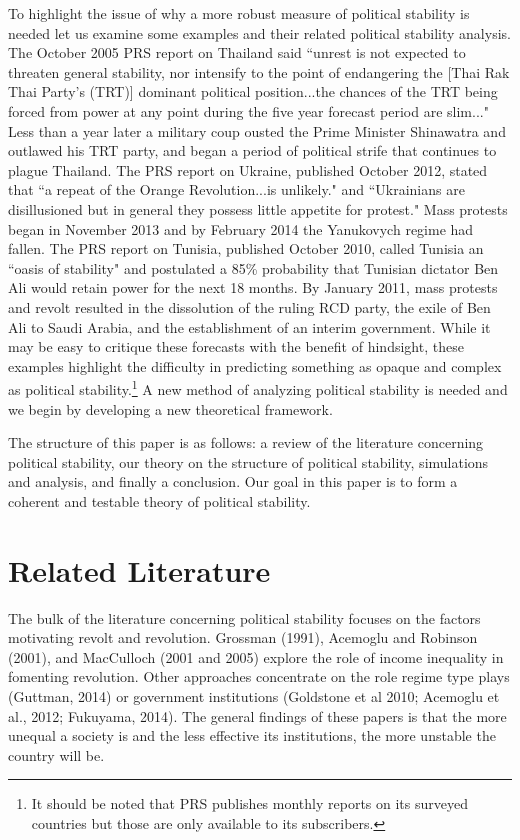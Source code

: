 \documentclass[12pt]{article}
\begin{document}
\begin{spacing}{1.5}
To highlight the issue of why a more robust measure of political stability is needed let us examine some examples and their related political stability analysis. The October 2005 PRS report on Thailand said ``unrest is not expected to threaten general stability, nor intensify to the point of endangering the [Thai Rak Thai Party's (TRT)] dominant political position...the chances of the TRT being forced from power at any point during the five year forecast period are slim..." Less than a year later a military coup ousted the Prime Minister Shinawatra and outlawed his TRT party, and began a period of political strife that continues to plague Thailand. The PRS report on Ukraine, published October 2012, stated that ``a repeat of the Orange Revolution...is unlikely." and ``Ukrainians are disillusioned but in general they possess little appetite for protest." Mass protests began in November 2013 and by February 2014 the Yanukovych regime had fallen. The PRS report on Tunisia, published October 2010, called Tunisia an ``oasis of stability" and postulated a 85\% probability that Tunisian dictator Ben Ali would retain power for the next 18 months. By January 2011, mass protests and revolt resulted in the dissolution of the ruling RCD party, the exile of Ben Ali to Saudi Arabia, and the establishment of an interim government. While it may be easy to critique these forecasts with the benefit of hindsight, these examples highlight the difficulty in predicting something as opaque and complex as political stability.\footnote{It should be noted that PRS publishes monthly reports on its surveyed countries but those are only available to its subscribers.} A new method of analyzing political stability is needed and we begin by developing a new theoretical framework. 


The structure of this paper is as follows: a review of the literature concerning political stability, our theory on the structure of political stability, simulations and analysis, and finally a conclusion. Our goal in this paper is to form a coherent and testable theory of political stability.   

\section{Related Literature}

The bulk of the literature concerning political stability focuses on the factors motivating revolt and revolution. Grossman (1991), Acemoglu and Robinson (2001), and MacCulloch (2001 and 2005) explore the role of income inequality in fomenting revolution. Other approaches concentrate on the role regime type plays (Guttman, 2014) or government institutions (Goldstone et al 2010; Acemoglu et al., 2012; Fukuyama, 2014). The general findings of these papers is that the more unequal a society is and the less effective its institutions, the more unstable the country will be. 


\end{spacing}
\end{document}
